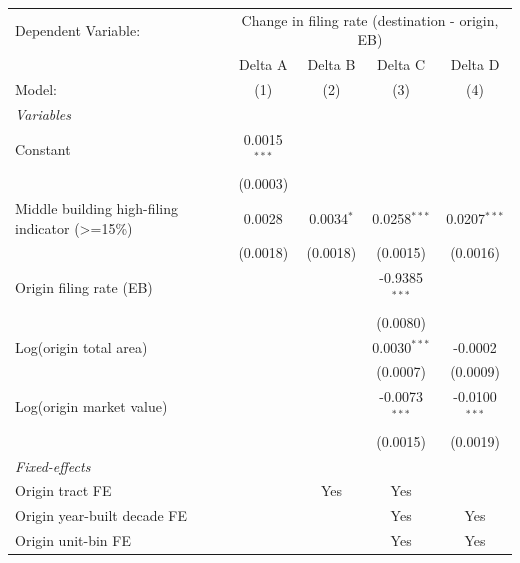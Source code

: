 \begingroup
\centering
\begin{tabular}{lcccc}
   \tabularnewline \midrule \midrule
   Dependent Variable: & \multicolumn{4}{c}{Change in filing rate (destination - origin, EB)}\\
                                                   & Delta A        & Delta B      & Delta C         & Delta D \\   
   Model:                                          & (1)            & (2)          & (3)             & (4)\\  
   \midrule
   \emph{Variables}\\
   Constant                                        & 0.0015$^{***}$ &              &                 &   \\   
                                                   & (0.0003)       &              &                 &   \\   
   Middle building high-filing indicator (>=15\%)  & 0.0028         & 0.0034$^{*}$ & 0.0258$^{***}$  & 0.0207$^{***}$\\   
                                                   & (0.0018)       & (0.0018)     & (0.0015)        & (0.0016)\\   
   Origin filing rate (EB)                         &                &              & -0.9385$^{***}$ &   \\   
                                                   &                &              & (0.0080)        &   \\   
   Log(origin total area)                          &                &              & 0.0030$^{***}$  & -0.0002\\   
                                                   &                &              & (0.0007)        & (0.0009)\\   
   Log(origin market value)                        &                &              & -0.0073$^{***}$ & -0.0100$^{***}$\\   
                                                   &                &              & (0.0015)        & (0.0019)\\   
   \midrule
   \emph{Fixed-effects}\\
   Origin tract FE                                 &                & Yes          & Yes             & \\  
   Origin year-built decade FE                     &                &              & Yes             & Yes\\  
   Origin unit-bin FE                              &                &              & Yes             & Yes\\  

\end{tabular}
